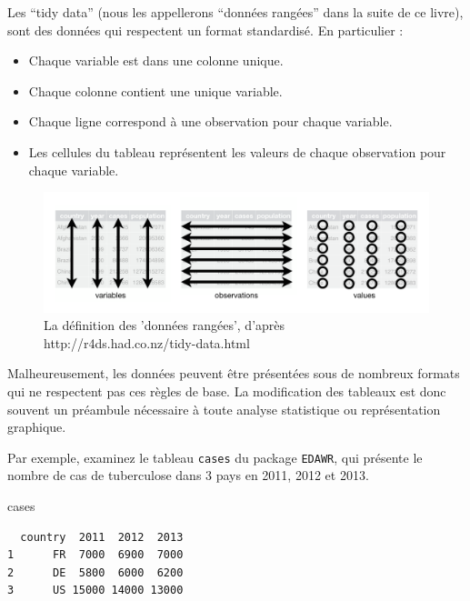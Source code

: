 \documentclass[
  a4paper,
]{article}
\newenvironment{Shaded}{\begin{snugshade}}{\end{snugshade}}
\newcommand{\NormalTok}[1]{\textcolor[rgb]{0.12,0.11,0.11}{#1}}
\providecommand{\tightlist}{%
  \setlength{\itemsep}{0pt}\setlength{\parskip}{0pt}}
\begin{document}
Les ``tidy data'' (nous les appellerons ``données rangées'' dans la suite de ce livre), sont des données qui respectent un format standardisé. En particulier :

\begin{itemize}
\tightlist
\item
  Chaque variable est dans une colonne unique.
\item
  Chaque colonne contient une unique variable.
\item
  Chaque ligne correspond à une observation pour chaque variable.
\item
  Les cellules du tableau représentent les valeurs de chaque observation pour chaque variable.
\end{itemize}

\begin{figure}[htpb]

{\centering \includegraphics[width=0.9\linewidth]{images/tidy} 

}

\caption{La définition des 'données rangées', d'après http://r4ds.had.co.nz/tidy-data.html}\label{fig:tidyschema}
\end{figure}

Malheureusement, les données peuvent être présentées sous de nombreux formats qui ne respectent pas ces règles de base. La modification des tableaux est donc souvent un préambule nécessaire à toute analyse statistique ou représentation graphique.

Par exemple, examinez le tableau \texttt{cases} du package \texttt{EDAWR}, qui présente le nombre de cas de tuberculose dans 3 pays en 2011, 2012 et 2013.

\begin{Shaded}
\begin{Highlighting}[]
\NormalTok{cases}
\end{Highlighting}
\end{Shaded}

\begin{verbatim}
  country  2011  2012  2013
1      FR  7000  6900  7000
2      DE  5800  6000  6200
3      US 15000 14000 13000
\end{verbatim}
\end{document}
